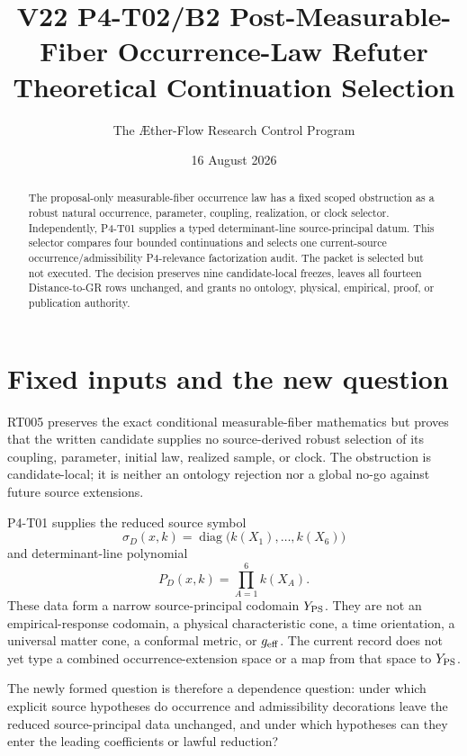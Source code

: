 \documentclass[11pt]{article}
\title{V22 P4-T02/B2 Post-Measurable-Fiber Occurrence-Law Refuter\\Theoretical Continuation Selection}
\author{The \AE ther-Flow Research Control Program}
\date{16 August 2026}
\begin{document}
\maketitle

\begin{abstract}
The proposal-only measurable-fiber occurrence law has a fixed scoped
obstruction as a robust natural occurrence, parameter, coupling, realization,
or clock selector. Independently, P4-T01 supplies a typed determinant-line
source-principal datum. This selector compares four bounded continuations and
selects one current-source occurrence/admissibility P4-relevance factorization
audit. The packet is selected but not executed. The decision preserves nine
candidate-local freezes, leaves all fourteen Distance-to-GR rows unchanged,
and grants no ontology, physical, empirical, proof, or publication authority.
\end{abstract}

\section{Fixed inputs and the new question}

RT005 preserves the exact conditional measurable-fiber mathematics but proves
that the written candidate supplies no source-derived robust selection of its
coupling, parameter, initial law, realized sample, or clock. The obstruction is
candidate-local; it is neither an ontology rejection nor a global no-go against
future source extensions.

P4-T01 supplies the reduced source symbol
\begin{equation}
 \sigma_D(x,k)=\operatorname{diag}
 \bigl(k(X_1),\ldots,k(X_6)\bigr)
\end{equation}
and determinant-line polynomial
\begin{equation}
 P_D(x,k)=\prod_{A=1}^{6} k(X_A).
 \label{eq:principal-polynomial}
\end{equation}
These data form a narrow source-principal codomain $Y_{\rm PS}$. They are not
an empirical-response codomain, a physical characteristic cone, a time
orientation, a universal matter cone, a conformal metric, or $g_{\rm eff}$.
The current record does not yet type a combined occurrence-extension space or
a map from that space to $Y_{\rm PS}$.

The newly formed question is therefore a dependence question: under which
explicit source hypotheses do occurrence and admissibility decorations leave
the reduced source-principal data unchanged, and under which hypotheses can
they enter the leading coefficients or lawful reduction?
\end{document}
